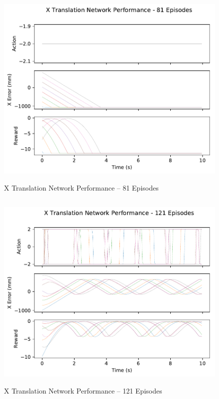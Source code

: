 \begin{figure}[H]
	\centering
	\includegraphics[width=6in, height=3.85in, keepaspectratio]{figures/train_figs/transx_transitions/1_81.pdf}
	\caption{X Translation Network Performance -- 81 Episodes}
\end{figure}
\begin{figure}[H]
	\centering
	\includegraphics[width=6in, height=3.85in, keepaspectratio]{figures/train_figs/transx_transitions/1_121.pdf}
	\caption{X Translation Network Performance -- 121 Episodes}
\end{figure}
